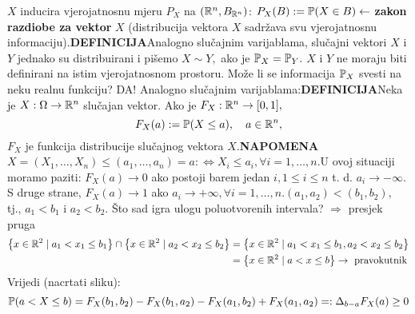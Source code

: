 \documentclass{article}
\begin{document}
\(X\) inducira vjerojatnosnu mjeru \(P_X\) na \(\left(\Bbb R^n, B_{\Bbb R^n}\right)\): \(P_X(B):=\Bbb P(X\in B)\leftarrow\) \textbf{zakon razdiobe za vektor} \(X\) (distribucija vektora \(X\) sadržava svu vjerojatnosnu informaciju).\newline\newline\textbf{DEFINICIJA}\newline Analogno slučajnim varijablama, slučajni vektori \(X\) i \(Y\) jednako su distribuirani i pišemo \(X\sim Y,\) ako je \(\Bbb P_X=\Bbb P_Y.\) \(X\) i \(Y\) ne moraju biti definirani na istim vjerojatnosnom prostoru. \newline\newline Može li se informacija \(\Bbb P_X\) svesti na neku realnu funkciju? DA! Analogno slučajnim varijablama:\newline\textbf{DEFINICIJA}\newline Neka je \(X:\Omega\to\Bbb R^n\) slučajan vektor. Ako je \(F_X:\Bbb R^n\to [0,1],\) \[F_X(a):=\Bbb P(X\le a),\quad a\in\Bbb R^n,\] \(F_X\)  je funkcija distribucije slučajnog vektora \(X.\)\newline {}\textbf{NAPOMENA}\newline \(X=(X_1,\ldots,X_n)\le (a_1,\ldots,a_n)=a:\Leftrightarrow X_i\le a_i,\forall i=1,\ldots,n.\)\newline U ovoj situaciji moramo paziti: \(F_X(a)\to 0\) ako postoji barem jedan \(i,1\le i\le n\) t. d. \(a_i\to-\infty.\)\newline S druge strane, \(F_X(a)\to 1\) ako \(a_i\to+\infty,\forall i=1,\ldots,n.\)\newline\newline \((a_1,a_2)<(b_1,b_2),\) tj., \(a_1<b_1\) i \(a_2<b_2.\) Što sad igra ulogu poluotvorenih intervala? \(\Rightarrow\) presjek pruga \[\begin{aligned}\left\{x\in\Bbb R^2\mid a_1<x_1\le b_1\right\}\cap\left\{x\in\Bbb R^2\mid a_2<x_2\le b_2\right\}&=\left\{x\in\Bbb R^2\mid a_1<x_1\le b_1,a_2<x_2\le b_2\right\}\\&=\left\{x\in\Bbb R^2\mid a< x\le b\right\}\to \text{ pravokutnik}\end{aligned}\] Vrijedi (nacrtati sliku): \[\Bbb P(a<X\le b)= F_X(b_1,b_2)-F_X(b_1,a_2)-F_X(a_1,b_2)+F_X(a_1,a_2)=:\Delta_{b-a}F_X(a)\ge 0\]
\end{document}
